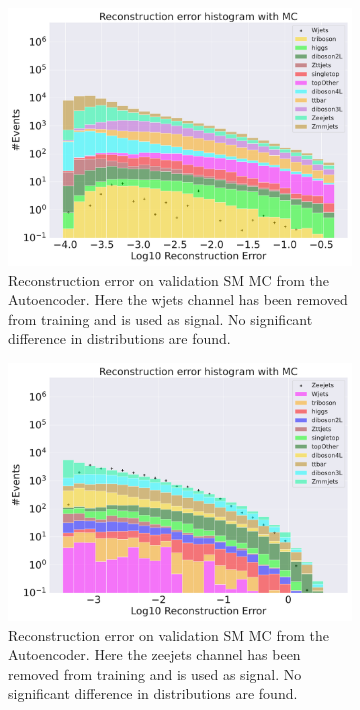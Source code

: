 \begin{figure}[h!]
    \centering
    \begin{subfigure}{.8\textwidth}
        \includegraphics[width=\textwidth]{Figures/AE_testing/small/b_data_recon_big_rm3_feats_sig_Wjets.pdf}
        \caption{Reconstruction error on validation SM MC from the Autoencoder. Here the wjets channel has been removed from training and 
        is used as signal. No significant difference in distributions are found. }
        \label{fig:ae_small_wjets}
    \end{subfigure}
    \hfill
    \begin{subfigure}{.8\textwidth}
        \includegraphics[width=\textwidth]{Figures/AE_testing/small/b_data_recon_big_rm3_feats_sig_Zeejets.pdf}
        \caption{Reconstruction error on validation SM MC from the Autoencoder. Here the zeejets channel has been removed from training and 
        is used as signal. No significant difference in distributions are found. }
        \label{fig:ae_small_zeejets}
    \end{subfigure}
    \hfill        
    \caption{ }
    \label{fig:ae_small_channel5}
\end{figure}

